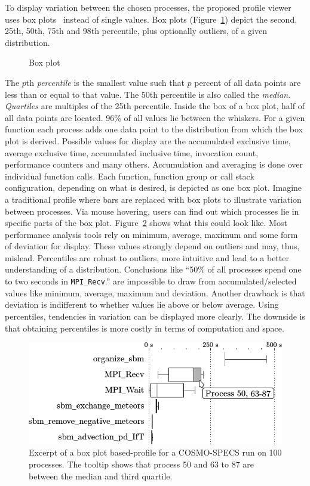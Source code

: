 \documentclass[a4paper, final, diplominf]{zih-template}
\begin{document}
To display variation between the chosen processes, the proposed profile viewer uses box plots~\cite{mcgill78} instead of single values.
Box plots (Figure~\ref{fig:box-plot}) depict the second, 25th, 50th, 75th and 98th percentile, plus optionally outliers, of a given distribution.
\begin{figure}[tb]
	\centering
	
	\caption{Box plot}
	\label{fig:box-plot}
\end{figure}
The $p$th \emph{percentile} is the smallest value such that $p$ percent of all data points are less than or equal to that value.
The 50th percentile is also called the \emph{median}.
\emph{Quartiles} are multiples of the 25th percentile.
Inside the box of a box plot, half of all data points are located.
96\% of all values lie between the whiskers.
For a given function each process adds one data point to the distribution from which the box plot is derived.
Possible values for display are the accumulated exclusive time, average exclusive time, accumulated inclusive time, invocation count, performance counters and many others.
Accumulation and averaging is done over individual function calls.
Each function, function group or call stack configuration, depending on what is desired, is depicted as one box plot.
Imagine a traditional profile where bars are replaced with box plots to illustrate variation between processes.
Via mouse hovering, users can find out which processes lie in specific parts of the box plot.
Figure~\ref{fig:box-plot-profile-mockup} shows what this could look like.
Most performance analysis tools rely on minimum, average, maximum and some form of deviation for display.
These values strongly depend on outliers and may, thus, mislead.
Percentiles are robust to outliers, more intuitive and lead to a better understanding of a distribution.
Conclusions like ``50\% of all processes spend one to two seconds in \texttt{MPI\_Recv}.'' are impossible to draw from accumulated/selected values like minimum, average, maximum and deviation.
Another drawback is that deviation is indifferent to whether values lie above or below average.
Using percentiles, tendencies in variation can be displayed more clearly.
The downside is that obtaining percentiles is more costly in terms of computation and space.
\begin{figure}[tb]
	\centering
	\includegraphics[width=12.6cm]{box-plot-profile-mockup} %
	\caption{Excerpt of a box plot based-profile for a COSMO-SPECS run on 100 processes. The tooltip shows that process 50 and 63 to 87 are between the median and third quartile.}
	\label{fig:box-plot-profile-mockup}
\end{figure}
\end{document}

